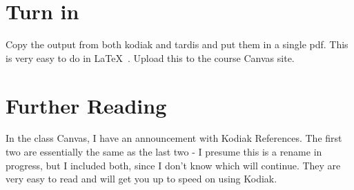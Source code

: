 \documentclass{article}
\begin{document}
\section{Turn in}
Copy the output from both kodiak and tardis and put them in a single pdf.  This is very easy to do in \LaTeX\ .  Upload this to the course Canvas site.


\section{Further Reading}
In the class Canvas, I have an announcement with Kodiak References.  The first two are essentially the same as the last two - I presume this is a rename in progress, but I included both, since I don't know which will continue.  They are very easy to read and will get you up to speed on using Kodiak.
\end{document}
